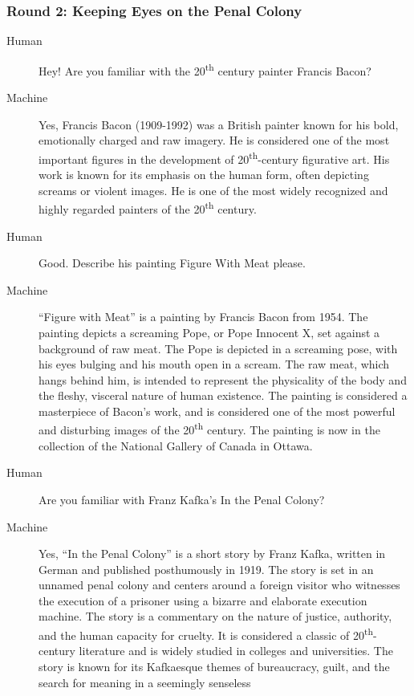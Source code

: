 \subsubsection{Round 2: Keeping Eyes on the Penal Colony}

\begin{description}
\item[Human] Hey! Are you familiar with the 20\textsuperscript{th} century
    painter Francis Bacon?
\item[Machine] Yes, Francis Bacon (1909-1992) was a British painter known for
    his bold, emotionally charged and raw imagery. He is considered one of the
    most important figures in the development of 20\textsuperscript{th}-century
    figurative art. His work is known for its emphasis on the human form, often
    depicting screams or violent images. He is one of the most widely recognized
    and highly regarded painters of the 20\textsuperscript{th} century.
\item[Human] Good. Describe his painting Figure With Meat please.
\item[Machine] ``Figure with Meat'' is a painting by Francis Bacon from 1954.
    The painting depicts a screaming Pope, or Pope Innocent X, set against a
    background of raw meat. The Pope is depicted in a screaming pose, with his
    eyes bulging and his mouth open in a scream. The raw meat, which hangs
    behind him, is intended to represent the physicality of the body and the
    fleshy, visceral nature of human existence. The painting is considered a
    masterpiece of Bacon's work, and is considered one of the most powerful and
    disturbing images of the 20\textsuperscript{th} century. The painting is now
    in the collection of the National Gallery of Canada in Ottawa.
\item[Human] Are you familiar with Franz Kafka's In the Penal Colony?
\item[Machine] Yes, ``In the Penal Colony'' is a short story by Franz Kafka,
    written in German and published posthumously in 1919. The story is set in an
    unnamed penal colony and centers around a foreign visitor who witnesses the
    execution of a prisoner using a bizarre and elaborate execution machine. The
    story is a commentary on the nature of justice, authority, and the human
    capacity for cruelty. It is considered a classic of
    20\textsuperscript{th}-century literature and is widely studied in colleges
    and universities. The story is known for its Kafkaesque themes of
    bureaucracy, guilt, and the search for meaning in a seemingly senseless

\end{description}
